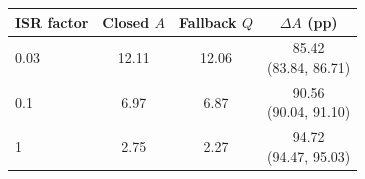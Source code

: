 \begin{tabular}{@{}lccc@{}}
\toprule
ISR factor & Closed $A$ & Fallback $Q$ & $\Delta A$ (pp)\\
\midrule
0.03 & 12.11 & 12.06 & \shortstack{85.42\\(83.84, 86.71)}\\[3pt]
0.1 & 6.97 & 6.87 & \shortstack{90.56\\(90.04, 91.10)}\\[3pt]
1 & 2.75 & 2.27 & \shortstack{94.72\\(94.47, 95.03)}\\[3pt]
\bottomrule
\end{tabular}
